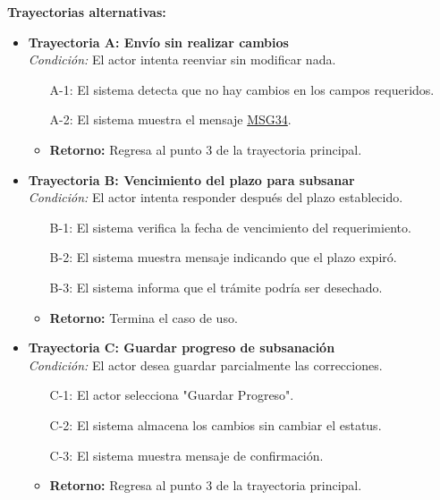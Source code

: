 \begin{appendices}
\textbf{Trayectorias alternativas:}
\begin{itemize}[leftmargin=*]
    \item \textbf{Trayectoria A: Envío sin realizar cambios} \\
    \textit{Condición:} El actor intenta reenviar sin modificar nada.
    \begin{itemize}[nosep]
        \item[A-1:] El sistema detecta que no hay cambios en los campos requeridos.
        \item[A-2:] El sistema muestra el mensaje \hyperlink{msg:MSG34}{MSG34}.
        \item \textbf{Retorno:} Regresa al punto 3 de la trayectoria principal.
    \end{itemize}
    \item \textbf{Trayectoria B: Vencimiento del plazo para subsanar} \\
    \textit{Condición:} El actor intenta responder después del plazo establecido.
    \begin{itemize}[nosep]
        \item[B-1:] El sistema verifica la fecha de vencimiento del requerimiento.
        \item[B-2:] El sistema muestra mensaje indicando que el plazo expiró.
        \item[B-3:] El sistema informa que el trámite podría ser desechado.
        \item \textbf{Retorno:} Termina el caso de uso.
    \end{itemize}
    \item \textbf{Trayectoria C: Guardar progreso de subsanación} \\
    \textit{Condición:} El actor desea guardar parcialmente las correcciones.
    \begin{itemize}[nosep]
        \item[C-1:] El actor selecciona "Guardar Progreso".
        \item[C-2:] El sistema almacena los cambios sin cambiar el estatus.
        \item[C-3:] El sistema muestra mensaje de confirmación.
        \item \textbf{Retorno:} Regresa al punto 3 de la trayectoria principal.
    \end{itemize}
\end{itemize}

\newpage


\end{appendices}
